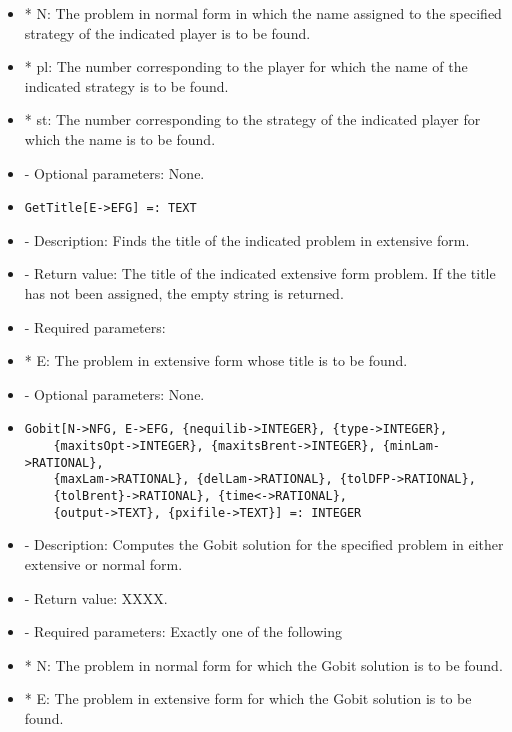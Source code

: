 \begin{itemize}
\bd
\item
*  N:  The problem in normal form in which the name assigned to the
specified strategy of the indicated player is to be found.
\item
*  pl:  The number corresponding to the player for which the name of
the indicated strategy is to be found.
\item
*  st:  The number corresponding to the strategy of the indicated 
player for which the name is to be found.
\ed

\item
- Optional parameters:  None.
\ed

\item
\begin{verbatim}
GetTitle[E->EFG] =: TEXT
\end{verbatim}

\bd
\item
- Description:  Finds the title of the indicated problem in extensive form.
\item
- Return value:  The title of the indicated extensive form problem.  If
the title has not been assigned, the empty string is returned.
\item
- Required parameters:

\bd
\item
*  E:  The problem in extensive form whose title is to be found.
\ed

\item
- Optional parameters:  None.
\ed

\item
\begin{verbatim}
Gobit[N->NFG, E->EFG, {nequilib->INTEGER}, {type->INTEGER},
	{maxitsOpt->INTEGER}, {maxitsBrent->INTEGER}, {minLam->RATIONAL},
	{maxLam->RATIONAL}, {delLam->RATIONAL}, {tolDFP->RATIONAL},
	{tolBrent}->RATIONAL}, {time<->RATIONAL}, 
	{output->TEXT}, {pxifile->TEXT}] =: INTEGER
\end{verbatim}

\bd
\item
- Description:  Computes the Gobit solution for the specified problem in
either extensive or normal form.  
\item
- Return value:  XXXX.
\item 
- Required parameters:  Exactly one of the following

\bd
\item
*  N:  The problem in normal form for which the Gobit solution is to
be found.
\item	
*  E:  The problem in extensive form for which the Gobit solution 
is to be found.
\ed


\end{itemize}
